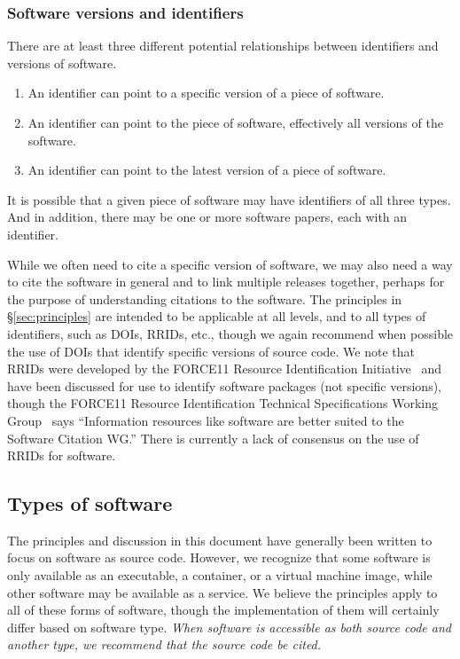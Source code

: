 \documentclass[12pt, oneside]{amsart}
\newcommand{\katznote}[1]{ {\textcolor{blue} { ***DSK: #1 }}} %
\newcommand{\LJHnote}[1]{ {\textcolor{fuschsia} { ***LJH: #1 }}} %
\begin{document}

\subsubsection*{Software versions and identifiers}

There are at least three different potential relationships between identifiers and versions of software.
\begin{enumerate}
\item An identifier can point to a specific version of a piece of software.
\item An identifier can point to the piece of software, effectively all versions of the software.
\item An identifier can point to the latest version of a piece of software.
\end{enumerate}
It is possible that a given piece of software may have identifiers of all three types.  And in addition,
there may be one or more software papers, each with an identifier.

While we often need to cite a specific version of software, we may also need a way to cite the
software in general and to link multiple releases together, perhaps for
the purpose of understanding citations to the software.  The principles in \S\ref{sec:principles} are
intended to be applicable at all levels, and to all types of identifiers, such as DOIs, RRIDs, etc.,
though we again recommend when possible the use of DOIs that identify specific versions of
source code.  We note that RRIDs were developed by the FORCE11 Resource Identification Initiative~\cite{f11rii}
and have been discussed for use to identify software packages (not specific versions),
though the FORCE11 Resource Identification Technical Specifications Working
Group~\cite{f11rrridtswg} says ``Information resources like software are better suited to
the Software Citation WG.''
There is currently a lack of consensus on the use of RRIDs for software.

\subsection{Types of software}

The principles and discussion in this document have generally been written to focus on software
as source code.  However, we recognize that some software is only available as an executable, a container, or a virtual machine image, while other software may be available as a service.  We believe the principles apply to all of these forms of software, though the implementation of them will certainly differ based on software type.
\textit{When software is accessible as both source code and another type, we recommend that the source code be cited.}
\end{document}
